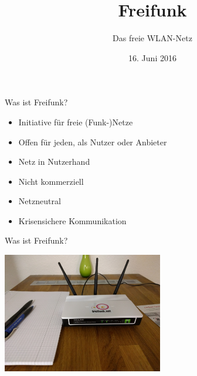 \documentclass[t]{beamer}
\title{Freifunk}
\author{Das freie WLAN-Netz} %
\date{16. Juni 2016}
\begin{document}
  \maketitle

  \begin{frame}{Was ist Freifunk?}
    \begin{itemize}
      \item Initiative für freie (Funk-)Netze
      \item Offen für jeden, als Nutzer oder Anbieter
      \item Netz in Nutzerhand
      \item Nicht kommerziell
      \item Netzneutral
      \item Krisensichere Kommunikation
    \end{itemize}
  \end{frame}

  \begin{frame}{Was ist Freifunk?}
    \begin{center}
      \includegraphics[width=7cm]{images/homerouter}
    \end{center}
  \end{frame}
\end{document}

